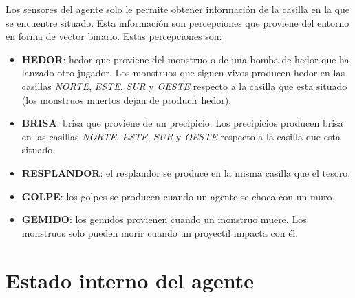 Los sensores del agente solo le permite obtener información de la casilla en la que se encuentre situado. Esta información son percepciones que proviene del entorno en forma de vector binario. Estas percepciones son:
\begin{itemize}
    \item \textbf{HEDOR}: hedor que proviene del monstruo o de una bomba de hedor que ha lanzado otro jugador. Los monstruos que siguen vivos producen hedor en las casillas \emph{NORTE}, \emph{ESTE}, \emph{SUR} y \emph{OESTE} respecto a la casilla que esta situado (los monstruos muertos dejan de producir hedor).
    \item \textbf{BRISA}: brisa que proviene de un precipicio. Los precipicios producen brisa en las casillas \emph{NORTE}, \emph{ESTE}, \emph{SUR} y \emph{OESTE} respecto a la casilla que esta situado.
    \item \textbf{RESPLANDOR}: el resplandor se produce en la misma casilla que el tesoro.
    \item \textbf{GOLPE}: los golpes se producen cuando un agente se choca con un muro.
    \item \textbf{GEMIDO}: los gemidos provienen cuando un monstruo muere. Los monstruos solo pueden morir cuando un proyectil impacta con él.
\end{itemize}

\section{Estado interno del agente}

